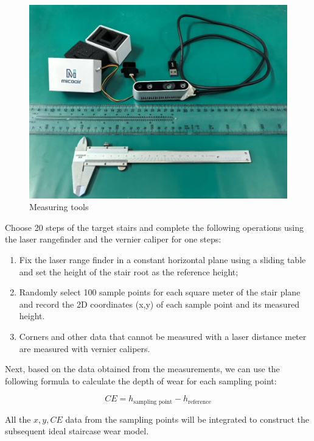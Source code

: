 \documentclass{mcmthesis}
\begin{document}
\begin{itemize}[label=$\diamond$]
\begin{figure}[h]  %
  \small
  \centering  %
  \includegraphics[width=12cm]{2-Measuring tools.jpg}
  \caption{Measuring tools} \label{fig:2}  %
  \end{figure}  %



  Choose 20 steps of the target stairs and complete the following operations using the laser rangefinder and the vernier caliper for one steps:

\begin{enumerate}
\item Fix the laser range finder in a constant horizontal plane using a sliding table and set the height of the stair root as the reference height;

\item Randomly select 100 sample points for each square meter of the stair plane and record the 2D coordinates (x,y) of each sample point and its measured height.

\item Corners and other data that cannot be measured with a laser distance meter are measured with vernier calipers.

\end{enumerate}

Next, based on the data obtained from the measurements, we can use the following formula to calculate the depth of wear for each sampling point:

\[ CE = h_{\text{sampling point}} - h_{\text{reference}} \]

All the \(x, y, CE\) data from the sampling points will be integrated to construct the subsequent ideal staircase wear model.


\end{itemize}
\end{document}
